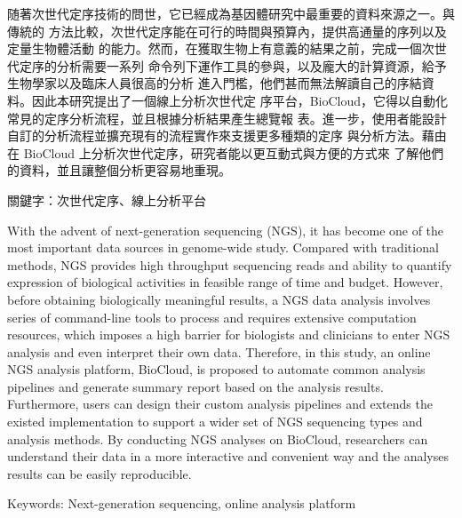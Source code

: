 \begin{abstractzh}
随著次世代定序技術的問世，它已經成為基因體研究中最重要的資料來源之一。與傳統的
方法比較，次世代定序能在可行的時間與預算內，提供高通量的序列以及定量生物體活動
的能力。然而，在獲取生物上有意義的結果之前，完成一個次世代定序的分析需要一系列
命令列下運作工具的參與，以及龐大的計算資源，給予生物學家以及臨床人員很高的分析
進入門檻，他們甚而無法解讀自己的序結資料。因此本研究提出了一個線上分析次世代定
序平台，BioCloud，它得以自動化常見的定序分析流程，並且根據分析結果產生總覽報
表。進一步，使用者能設計自訂的分析流程並擴充現有的流程實作來支援更多種類的定序
與分析方法。藉由在 BioCloud 上分析次世代定序，研究者能以更互動式與方便的方式來
了解他們的資料，並且讓整個分析更容易地重現。

\vspace{1.5em}\noindent
關鍵字：次世代定序、線上分析平台
\end{abstractzh}

\begin{abstracten}

With the advent of next-generation sequencing (NGS), it has become one of the
most important data sources in genome-wide study. Compared with traditional
methods, NGS provides high throughput sequencing reads and ability to quantify
expression of biological activities in feasible range of time and budget.
However, before obtaining biologically meaningful results, a NGS data analysis
involves series of command-line tools to process and requires extensive
computation resources, which imposes a high barrier for biologists and
clinicians to enter NGS analysis and even interpret their own data. Therefore,
in this study, an online NGS analysis platform, BioCloud, is proposed to
automate common analysis pipelines and generate summary report based on the
analysis results. Furthermore, users can design their custom analysis pipelines
and extends the existed implementation to support a wider set of NGS sequencing
types and analysis methods. By conducting NGS analyses on BioCloud, researchers
can understand their data in a more interactive and convenient way and the
analyses results can be easily reproducible.

\vspace{2em}\noindent
Keywords: Next-generation sequencing, online analysis platform
\end{abstracten}

